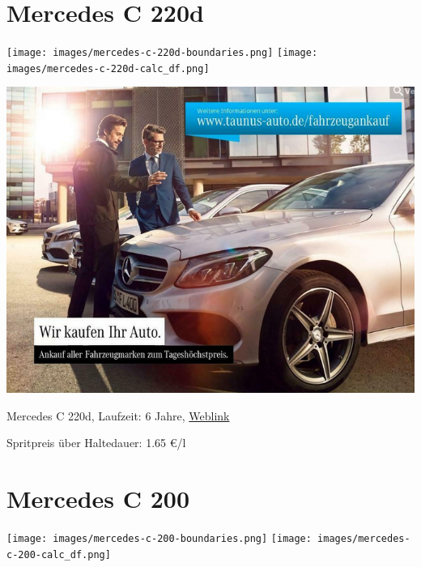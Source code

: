 \documentclass[landscape, DIV=99, 14pt]{scrartcl}
\begin{document}
\pagebreak


\twocolumn

\section*{Mercedes C 220d}
\begin{center}
\texttt{[image: images/mercedes-c-220d-boundaries.png]}
\null
\vspace{0.5cm}
\texttt{[image: images/mercedes-c-220d-calc\_df.png]}
\end{center}

\pagebreak
\null
\vspace{2cm}
\begin{center}
\includegraphics[width=0.9\columnwidth]{cars/mercedes-c-220d-t.png}

Mercedes C 220d, Laufzeit: 6 Jahre, \href{https://suchen.mobile.de/fahrzeuge/details.html?action=parkItem&id=336723447}{Weblink}

Spritpreis \"uber Haltedauer: 1.65 \euro{}/l

\end{center}

\pagebreak


\twocolumn

\section*{Mercedes C 200}
\begin{center}
\texttt{[image: images/mercedes-c-200-boundaries.png]}
\null
\vspace{0.5cm}
\texttt{[image: images/mercedes-c-200-calc\_df.png]}
\end{center}
\end{document}
